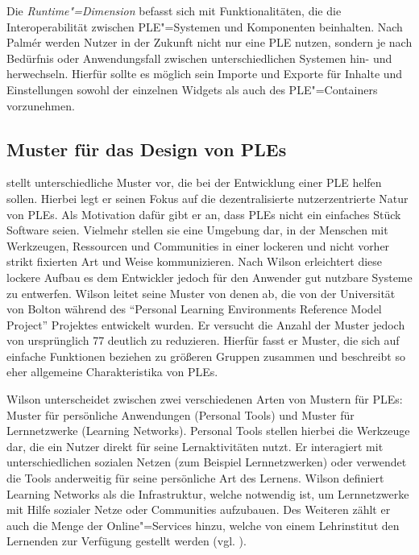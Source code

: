Die \emph{Runtime"=Dimension} befasst sich mit Funktionalitäten, die die Interoperabilität zwischen \ac{PLE}"=Systemen und Komponenten beinhalten. Nach Palmér werden Nutzer in der Zukunft nicht nur eine \ac{PLE} nutzen, sondern je nach Bedürfnis oder Anwendungsfall zwischen unterschiedlichen Systemen hin- und herwechseln. Hierfür sollte es möglich sein Importe und Exporte für Inhalte und Einstellungen sowohl der einzelnen Widgets als auch des \ac{PLE}"=Containers vorzunehmen.

\subsection{Muster für das Design von \acsp{PLE}}\label{section:wilson_patterns}
\cite{Wilson2008} stellt unterschiedliche Muster vor, die bei der Entwicklung einer \ac{PLE} helfen sollen. Hierbei legt er seinen Fokus auf die dezentralisierte  nutzerzentrierte Natur von \acp{PLE}. Als Motivation dafür gibt er an, dass \acp{PLE} nicht ein einfaches Stück Software seien. Vielmehr stellen sie eine Umgebung dar, in der Menschen mit Werkzeugen, Ressourcen und Communities in einer lockeren und nicht vorher strikt fixierten Art und Weise kommunizieren. Nach Wilson erleichtert diese lockere Aufbau es dem Entwickler jedoch für den Anwender gut nutzbare Systeme zu entwerfen. Wilson leitet seine Muster von denen ab, die von der Universität von Bolton während des "`Personal Learning Environments Reference Model Project"' Projektes entwickelt wurden. Er versucht die Anzahl der Muster jedoch von ursprünglich 77 deutlich zu reduzieren. Hierfür fasst er Muster, die sich auf einfache Funktionen beziehen zu größeren Gruppen zusammen und beschreibt so eher allgemeine Charakteristika von \acp{PLE}.

Wilson unterscheidet zwischen zwei verschiedenen Arten von Mustern für \acp{PLE}: Muster für persönliche Anwendungen (Personal Tools) und Muster für Lernnetzwerke (Learning Networks). Personal Tools stellen hierbei die Werkzeuge dar, die ein Nutzer direkt für seine Lernaktivitäten nutzt. Er interagiert mit unterschiedlichen sozialen Netzen (zum Beispiel Lernnetzwerken) oder verwendet die Tools anderweitig für seine persönliche Art des Lernens. 
Wilson definiert Learning Networks als die Infrastruktur, welche notwendig ist, um Lernnetzwerke mit Hilfe sozialer Netze oder Communities aufzubauen. Des Weiteren zählt er auch die Menge der Online"=Services hinzu, welche von einem Lehrinstitut den Lernenden zur Verfügung gestellt werden (vgl. \cite{Wilson2008}).

